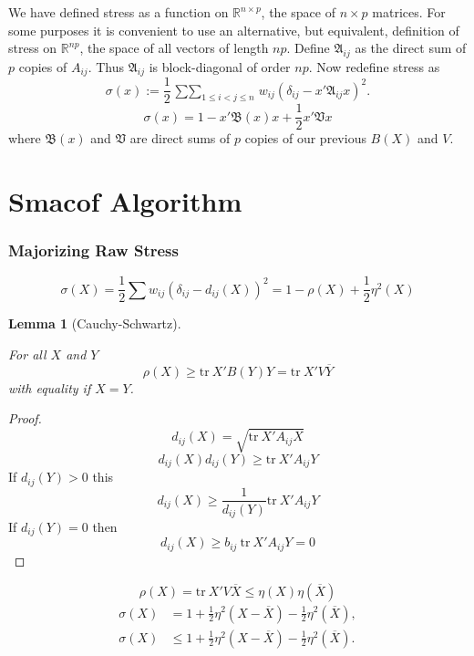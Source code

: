 \documentclass[
  12pt,
  letterpaper,
  DIV=11,
  numbers=noendperiod]{scrartcl}
\theoremstyle{plain}
\newtheorem{lemma}{Lemma}[section]
\theoremstyle{remark}
\begin{document}
We have defined stress as a function on \(\mathbb{R}^{n\times p}\), the
space of \(n\times p\) matrices. For some purposes it is convenient to
use an alternative, but equivalent, definition of stress on
\(\mathbb{R}^{np}\), the space of all vectors of length \(np\). Define
\(\mathfrak{A}_{ij}\) as the direct sum of \(p\) copies of \(A_{ij}\).
Thus \(\mathfrak{A}_{ij}\) is block-diagonal of order \(np\). Now
redefine stress as \[
\sigma(x):=\frac12\mathop{\sum\sum}_{1\leq i<j\leq n}w_{ij}(\delta_{ij}-x'\mathfrak{A}_{ij}x)^2.
\] \[
\sigma(x)=1-x'\mathfrak{B}(x)x+\frac12 x'\mathfrak{V}x
\] where \(\mathfrak{B}(x)\) and \(\mathfrak{V}\) are direct sums of
\(p\) copies of our previous \(B(X)\) and \(V\).

\section{Smacof Algorithm}\label{smacof-algorithm}

\subsubsection{Majorizing Raw Stress}\label{majorizing-raw-stress}

\[
\sigma(X)=\frac12\sum w_{ij}(\delta_{ij}-d_{ij}(X))^2=1-\rho(X)+\frac12\eta^2(X)
\]

\begin{lemma}[Cauchy-Schwartz]\protect\hypertarget{lem-cs}{}\label{lem-cs}

For all \(X\) and \(Y\) \[
\rho(X)\geq\text{tr}\ X'B(Y)Y=\text{tr}\ X'V\overline{Y}
\] with equality if \(X=Y\).

\end{lemma}

\begin{proof}
\[
d_{ij}(X)=\sqrt{\text{tr}\ X'A_{ij}X}
\] \[
d_{ij}(X)d_{ij}(Y)\geq\text{tr}\ X'A_{ij}Y
\] If \(d_{ij}(Y)>0\) this \[
d_{ij}(X)\geq\frac{1}{d_{ij}(Y)}\text{tr}\ X'A_{ij}Y
\] If \(d_{ij}(Y)=0\) then \[
d_{ij}(X)\geq b_{ij}\ \text{tr}\ X'A_{ij}Y=0
\]
\end{proof}

\[
\rho(X)=\text{tr}\ X'V\overline X\leq\eta(X)\eta(\overline X)
\] \begin{align}
\sigma(X)&=1+\frac12\eta^2(X-\overline X)-\frac12\eta^2(\overline X),\\
\sigma(X)&\leq 1+\frac12\eta^2(X-\overline X)-\frac12\eta^2(\overline X).
\end{align}
\end{document}
